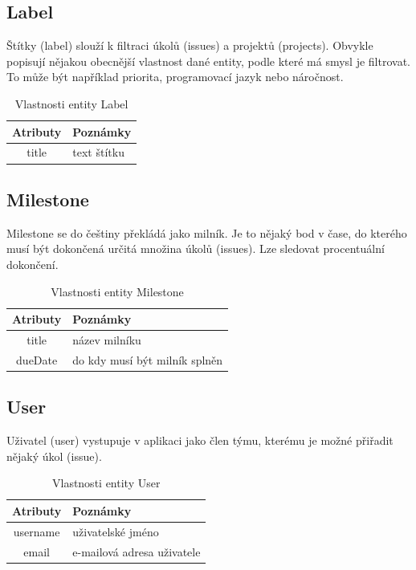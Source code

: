 \subsection{Label}
Štítky (label) slouží k filtraci úkolů (issues) a projektů (projects). Obvykle popisují nějakou obecnější vlastnost dané entity, podle které má smysl je filtrovat. To může být například priorita, programovací jazyk nebo náročnost.

\begin{table}
\begin{center}
	\begin{tabular}{|c|l|}
	\hline
	Atributy & Poznámky \\
	\hline
	title & text štítku \\
	\hline
	\end{tabular}
\end{center}
\caption{Vlastnosti entity Label}
\label{tab:label}
\end{table}

\subsection{Milestone}
Milestone se do češtiny překládá jako milník. Je to nějaký bod v čase, do kterého musí být dokončená určitá množina úkolů (issues). Lze sledovat procentuální dokončení.

\begin{table}
\begin{center}
	\begin{tabular}{|c|l|}
	\hline
	Atributy & Poznámky \\
	\hline
	title & název milníku \\
	dueDate & do kdy musí být milník splněn \\
	\hline
	\end{tabular}
\end{center}
\caption{Vlastnosti entity Milestone}
\label{tab:milestone}
\end{table}

\subsection{User}
Uživatel (user) vystupuje v aplikaci jako člen týmu, kterému je možné přiřadit nějaký úkol (issue).

\begin{table}
\begin{center}
	\begin{tabular}{|c|l|}
	\hline
	Atributy & Poznámky \\
	\hline
	username & uživatelské jméno \\
	email & e-mailová adresa uživatele \\
	\hline
	\end{tabular}
\end{center}
\caption{Vlastnosti entity User}
\label{tab:user}
\end{table}


